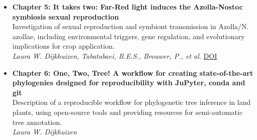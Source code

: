 \documentclass[a4paper,10pt]{article}
\begin{document}
\begin{itemize}
  \item \textbf{Chapter 5: It takes two: Far-Red light induces the Azolla-Nostoc symbiosis sexual reproduction} \\
    Investigation of sexual reproduction and symbiont transmission in Azolla/N. azollae, including environmental triggers, gene regulation, and evolutionary implications for crop application. \\
    \emph{Laura W. Dijkhuizen, Tabatabaei, B.E.S., Brouwer, P., et al.}
    \href{https://doi.org/10.1101/2020.09.09.289736}{DOI}

  \item \textbf{Chapter 6: One, Two, Tree! A workflow for creating state-of-the-art phylogenies designed for reproducibility with JuPyter, conda and git} \\
    Description of a reproducible workflow for phylogenetic tree inference in land plants, using open-source tools and providing resources for semi-automatic tree annotation. \\
    \emph{Laura W. Dijkhuizen}
\end{itemize}
\end{document}
